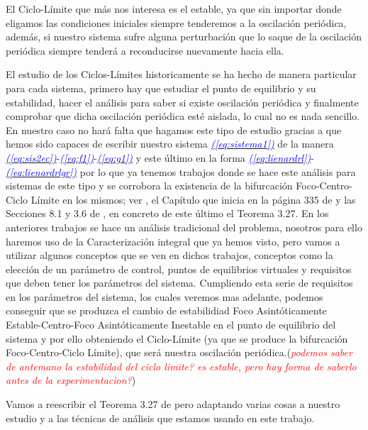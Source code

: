 \documentclass[12pt,a4paper]{report} %
\newcommand{\eref}[1]{\hyperref[#1]{\textcolor{blue}{\textit{(\ref*{#1})}}}}
\begin{document}
	El Ciclo-Límite que más nos interesa es el estable, ya que sin importar donde eligamos las condiciones iniciales siempre tenderemos a la oscilación periódica, además, si nuestro sistema sufre alguna perturbación que lo saque de la oscilación periódica siempre tenderá a reconducirse nuevamente hacia ella.
	
	\vspace{0.5cm}El estudio de los Ciclos-Límites historicamente se ha hecho de manera particular para cada sistema, primero hay que estudiar el punto de equilibrio y su estabilidad, hacer el análisis para saber si existe oscilación periódica y finalmente comprobar que dicha oscilación periódica esté aislada, lo cual no es nada sencillo. En nuestro caso no hará falta que hagamos este tipo de estudio gracias a que hemos sido capaces de escribir nuestro sistema \eref{eq:sistema1} de la manera \eref{eq:sis2ec}-\eref{eq:f1}-\eref{eq:g1} y este último en la forma \eref{eq:lienardrl}-\eref{eq:lienardrlgr} por lo que ya tenemos trabajos donde se hace este análisis para sistemas de este tipo y se corrobora la existencia de la bifurcación Foco-Centro-Ciclo Límite en los mismos; ver \cite{ponce}, el Capítulo que inicia en la página 335 de \cite{ciclolimite} y las Secciones 8.1 y 3.6 de \cite{amarillo}, en concreto de este último el Teorema 3.27. En los anteriores trabajos se hace un análisis tradicional del problema, nosotros para ello haremos uso de la Caracterización integral que ya hemos visto, pero vamos a utilizar algunos conceptos que se ven en dichos trabajos, conceptos como la elección de un parámetro de control, puntos de equilibrios virtuales y requisitos que deben tener los parámetros del sistema. Cumpliendo esta serie de requisitos en los parámetros del sistema, los cuales veremos mas adelante, podemos conseguir que se produzca el cambio de estabilidiad Foco Asintóticamente Estable-Centro-Foco Asintóticamente Inestable en el punto de equilibrio del sistema y por ello obteniendo el Ciclo-Límite (ya que se produce la bifurcación Foco-Centro-Ciclo Límite), que será nuestra oscilación periódica.(\textit{\textcolor{red}{podemos saber de antemano la estabilidad del ciclo limite? es estable, pero hay forma de saberlo antes de la experimentacion?}})
	
	\newpage
	
	\vspace{0.5cm}\noindent Vamos a reescribir el Teorema 3.27 de \cite{amarillo} pero adaptando varias cosas a nuestro estudio y a las técnicas de análisis que estamos usando en este trabajo.
	
\end{document}
